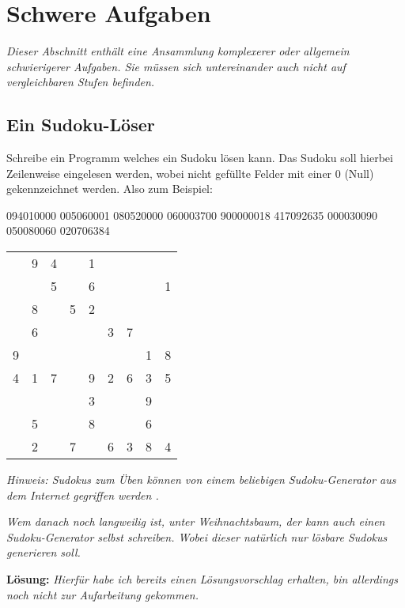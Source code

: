 \documentclass[table]{sopra-base}
\makeatletter
\newenvironment{solution}{\null\par\noindent\textbf{\textcolor{sob@col@uulm@cs}{Lösung:}}\newline\bgroup\color{black}\slshape\ignorespaces}{\egroup}
\makeatother
\begin{document}
\section{Schwere Aufgaben}

\textit{Dieser Abschnitt enthält eine Ansammlung komplexerer oder allgemein schwierigerer Aufgaben. Sie müssen sich untereinander auch nicht auf vergleichbaren Stufen befinden.}

\subsection{Ein Sudoku-Löser}

Schreibe ein Programm welches ein Sudoku lösen kann. Das Sudoku soll hierbei Zeilenweise eingelesen werden, wobei nicht gefüllte Felder mit
einer $0$ (Null) gekennzeichnet werden. Also zum Beispiel:\smallskip\newline
\begin{minipage}{0.5\linewidth}
\begin{void}
094010000
005060001
080520000
060003700
900000018
417092635
000030090
050080060
020706384
\end{void}
\end{minipage}\begin{minipage}{0.5\linewidth}
\centering \begin{tabular}{ccc|ccc|ccc}
&9&4&&1&&&&\\
&&5&&6&&&&1\\
&8&&5&2&&&&\\\hline
&6&&&&3&7&&\\
9&&&&&&&1&8\\
4&1&7&&9&2&6&3&5\\\hline
&&&&3&&&9&\\
&5&&&8&&&6&\\
&2&&7&&6&3&8&4\\
\end{tabular}
\end{minipage}\par
\textit{Hinweis: Sudokus zum Üben können von einem beliebigen Sudoku-Generator aus dem Internet gegriffen werden \Smiley.}\par{}
\textit{Wem danach noch langweilig ist, unter Weihnachtsbaum, der kann auch einen Sudoku-Generator selbst schreiben. Wobei dieser natürlich nur lösbare Sudokus generieren soll.}\par{}

\begin{solution}
    Hierfür habe ich bereits einen Lösungsvorschlag erhalten, bin allerdings noch nicht zur Aufarbeitung gekommen.
\end{solution}
\end{document}
